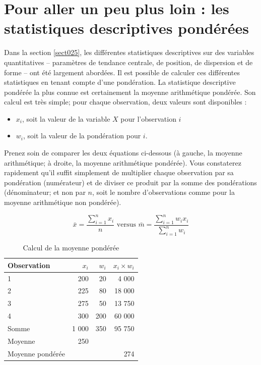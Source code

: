 \documentclass[
  11pt,
  french,
]{book}
\providecommand{\tightlist}{%
  \setlength{\itemsep}{0pt}\setlength{\parskip}{0pt}}
\begin{document}
\hypertarget{sect027}{%
\section{Pour aller un peu plus loin : les statistiques descriptives pondérées}\label{sect027}}

Dans la section \ref{sect025}, les différentes statistiques descriptives sur des variables quantitatives -- paramètres de tendance centrale, de position, de dispersion et de forme -- ont été largement abordées. Il est possible de calculer ces différentes statistiques en tenant compte d'une pondération. La statistique descriptive pondérée la plus connue est certainement la moyenne arithmétique pondérée. Son calcul est très simple; pour chaque observation, deux valeurs sont disponibles :

\begin{itemize}
\tightlist
\item
  \(x_i\), soit la valeur de la variable \(X\) pour l'observation \(i\)
\item
  \(w_i\), soit la valeur de la pondération pour \(i\).
\end{itemize}

Prenez soin de comparer les deux équations ci-dessous (à gauche, la moyenne arithmétique; à droite, la moyenne arithmétique pondérée). Vous constaterez rapidement qu'il suffit simplement de multiplier chaque observation par sa pondération (numérateur) et de diviser ce produit par la somme des pondérations (dénominateur; et non par \(n\), soit le nombre d'observations comme pour la moyenne arithmétique non pondérée).

\footnotesize

\begin{equation}  
\bar{x}=\frac{\sum_{i=1}^n x_i}{n} \text { versus } \bar{m}=\frac{\sum_{i=1}^n  w_ix_i}{\sum_{i=1}^nw_i}
\label{eq:moypond}
\end{equation}
\normalsize 

\begin{table}

\caption{\label{tab:MoyPondCalcul}Calcul de la moyenne pondérée}
\centering
\fontsize{8}{10}\selectfont
\begin{tabular}[t]{lrrr}
\toprule
Observation & $x_i$ & $w_i$ & $x_i \times w_i$\\
\midrule
1 & 200 & 20 & 4 000\\
2 & 225 & 80 & 18 000\\
3 & 275 & 50 & 13 750\\
4 & 300 & 200 & 60 000\\
Somme & 1 000 & 350 & 95 750\\
\addlinespace
Moyenne & 250 &  & \\
Moyenne pondérée &  &  & 274\\
\bottomrule
\end{tabular}
\end{table}
\end{document}
